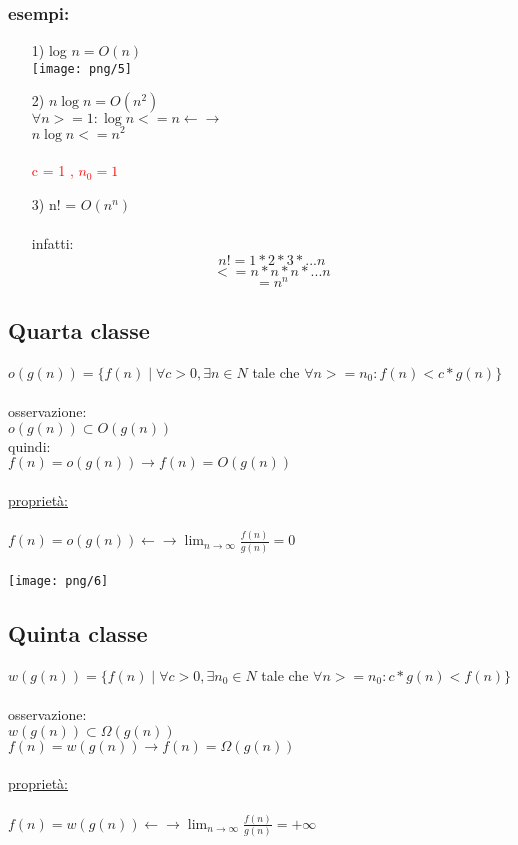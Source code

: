 \documentclass[12pt, letterpaper]{article}
\begin{document}
\subsubsection{esempi:}

\begin{itemize}
   \item[1)]log $ n = O(n)$
\\
\texttt{[image: png/5]}
\item[2)]
$n \log n = O(n^2)$
\\
$\forall n >= 1 : \log n <= n \leftarrow\rightarrow $
\\$n \log n <= n^2$\\
\\
\textcolor{red}{c = 1 , $n_0 = 1$}
\item[3)]
   n!  = $O(n^n)$
      \\
      \\
      infatti: 
      \[n! = 1*2*3*...n\]
      \[<= n*n*n*...n\]
      \[= n^n\]

\end{itemize}
\subsection{Quarta classe}

$o(g(n)) = \{f(n)\;|\; \forall c > 0 , \exists n \in N$ tale che $\forall n >= n_0 : f(n) < c * g(n)\}$
\\
\\osservazione:
\\$o(g(n)) \subset O(g(n))$
\\
quindi: \\
$f(n) = o(g(n)) \rightarrow f(n) = O(g(n))$
\\
\\
\underline{proprietà:}
\\
\\
$f(n) = o(g(n)) \leftarrow\rightarrow \lim_{n\to\infty} \frac{f(n)}{g(n)} = 0$
\\
\\
\texttt{[image: png/6]}

\subsection{Quinta classe}

$w(g(n)) = \{f(n)\;|\;\forall c > 0, \exists n_0 \in N $ tale che $\forall n >= n_0 : c * g(n) < f(n)\}$
\\
\\
osservazione:\\
$w(g(n)) \subset \Omega(g(n))$
\\
$f(n) = w(g(n)) \rightarrow f(n) = \Omega(g(n))$
\\
\\
\underline{proprietà:}
\\
\\
$f(n) = w(g(n)) \leftarrow\rightarrow \lim_{n\to\infty} \frac{f(n)}{g(n)} = +\infty$
\end{document}
